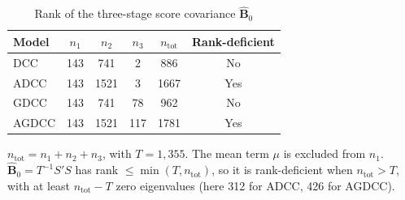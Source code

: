 \begin{table}[H]
\centering
\caption{Rank of the three-stage score covariance $\hat{\mathbf{B}}_0$}
\label{tab:vcv_rank}
\begin{threeparttable}
\begin{tabular}{lSSSSc}
\toprule
Model &  &  &  &  & Rank-deficient \\
\midrule
DCC & 143 & 741 & 2 & 886 & No \\
ADCC & 143 & 1521 & 3 & 1667 & Yes \\
GDCC & 143 & 741 & 78 & 962 & No \\
AGDCC & 143 & 1521 & 117 & 1781 & Yes \\
\bottomrule
\end{tabular}
\begin{tablenotes}[flushleft]
\small
\item $n_{\mathrm{tot}} = n_1 + n_2 + n_3$, with $T = 1{,}355$. The mean term $\mu$ is excluded from $n_1$. $\hat{\mathbf{B}}_0 = T^{-1}S'S$ has rank $\leq \min(T, n_{\mathrm{tot}})$, so it is rank-deficient when $n_{\mathrm{tot}} > T$, with at least $n_{\mathrm{tot}} - T$ zero eigenvalues (here 312 for ADCC, 426 for AGDCC).
\end{tablenotes}
\end{threeparttable}
\end{table}
